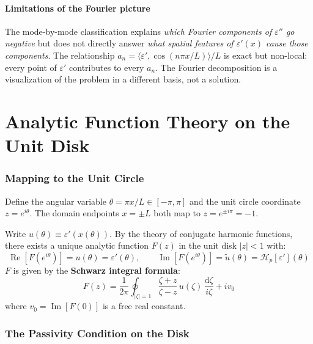 \documentclass[11pt]{article}
\newcommand{\eps}{\varepsilon}
\newcommand{\Hp}{\mathcal{H}_p}
\newcommand{\dd}{\mathrm{d}}
\begin{document}
\subsection{Limitations of the Fourier picture}

The mode-by-mode classification explains \emph{which Fourier components of $\eps''$ go negative} but does not directly answer \emph{what spatial features of $\eps'(x)$ cause those components}.  The relationship $a_n = \langle \eps', \cos(n\pi x/L)\rangle/L$ is exact but non-local: every point of $\eps'$ contributes to every $a_n$.  The Fourier decomposition is a visualization of the problem in a different basis, not a solution.


\part{Analytic Function Theory on the Unit Disk}

\section{Mapping to the Unit Circle}\label{sec:unit-circle}

Define the angular variable $\theta = \pi x/L \in [-\pi, \pi]$ and the unit circle coordinate $z = e^{i\theta}$.  The domain endpoints $x = \pm L$ both map to $z = e^{\pm i\pi} = -1$.

Write $u(\theta) \equiv \eps'(x(\theta))$.  By the theory of conjugate harmonic functions, there exists a unique analytic function $F(z)$ in the unit disk $|z| < 1$ with:
\begin{equation}
\operatorname{Re}[F(e^{i\theta})] = u(\theta) = \eps'(\theta), \qquad \operatorname{Im}[F(e^{i\theta})] = \tilde{u}(\theta) = \Hp[\eps'](\theta)
\end{equation}
$F$ is given by the \textbf{Schwarz integral formula}:
\begin{equation}\label{eq:schwarz}
F(z) = \frac{1}{2\pi}\oint_{|\zeta|=1} \frac{\zeta + z}{\zeta - z}\,u(\zeta)\,\frac{\dd\zeta}{i\zeta} + iv_0
\end{equation}
where $v_0 = \operatorname{Im}[F(0)]$ is a free real constant.

\section{The Passivity Condition on the Disk}
\end{document}
